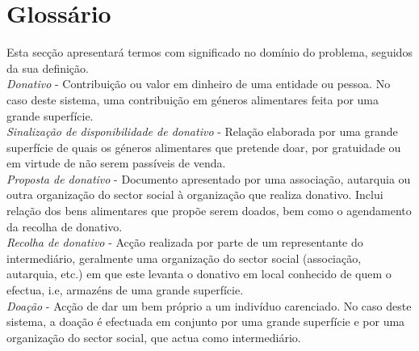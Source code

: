 \section{Glossário}

Esta secção apresentará termos com significado no domínio do problema, seguidos da sua definição.\\

\textit{Donativo} - Contribuição ou valor em dinheiro de uma entidade ou pessoa. No caso deste sistema, uma contribuição em géneros alimentares feita por uma grande superfície.\\

\textit{Sinalização de disponibilidade de donativo} - Relação elaborada por uma grande superfície de quais os géneros alimentares que pretende doar, por gratuidade ou em virtude de não serem passíveis de venda.\\

\textit{Proposta de donativo} - Documento apresentado por uma associação, autarquia ou outra organização do sector social à organização que realiza donativo. Inclui relação dos bens alimentares que propõe serem doados, bem como o agendamento da recolha de donativo.\\

\textit{Recolha de donativo} - Acção realizada por parte de um representante do intermediário, geralmente uma organização do sector social (associação, autarquia, etc.) em que este levanta o donativo em local conhecido de quem o efectua, i.e, armazéns de uma grande superfície.\\

\textit{Doação} - Acção de dar um bem próprio a um indivíduo carenciado. No caso deste sistema, a doação é efectuada em conjunto por uma grande superfície e por uma organização do sector social, que actua como intermediário.\\

\clearpage